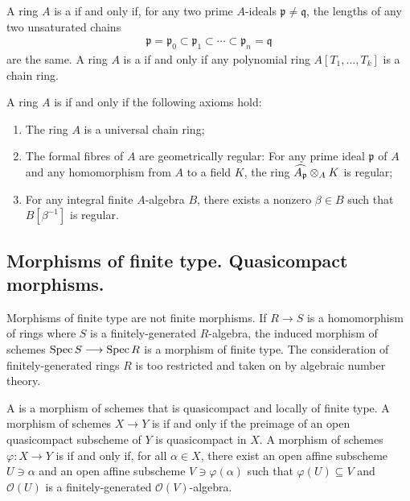 \documentclass [11 pt, oneside] {article}
\begin{document}
\begin{definition}[ ]\label{}\text{}
A ring $A$ is a  if and only if, for any two prime $A$-ideals $\mathfrak{p}\ne \mathfrak{q}$, the lengths of any two unsaturated chains 
\begin{align*}
	\mathfrak{p} = \mathfrak{p}_0 \subset \mathfrak{p}_1\subset\cdots\subset \mathfrak{p}_n=\mathfrak{q}
\end{align*}
are the same. A ring $A$ is a  if and only if any polynomial ring $A[T_1,\hdots, T_k]$ is a chain ring.
\end{definition}


\begin{definition}[ ]\label{}\text{}
A ring $A$ is  if and only if the following axioms hold:
\begin{enumerate}
	\item The ring $A$ is a universal chain ring;
	\item The formal fibres of $A$ are geometrically regular: For any prime ideal $\mathfrak{p}$ of $A$ and any homomorphism from $A$ to a field $K$, the ring $\widehat{A_{\mathfrak{p}}}\otimes_A K$ is regular;
	\item For any integral finite $A$-algebra $B$, there exists a nonzero $\beta\in B$ such that $B[\beta^{-1}]$ is regular.
\end{enumerate}
\end{definition}

\subsection{Morphisms of finite type. Quasicompact morphisms.}
Morphisms of finite type are not finite morphisms. If $R\longrightarrow S$ is a homomorphism of rings where $S$ is a finitely-generated $R$-algebra, the induced morphism of schemes $\operatorname{Spec} S \longrightarrow \operatorname{Spec} R$ is a morphism of finite type. The consideration of finitely-generated rings $R$ is too restricted and taken on by algebraic number theory.

A  is a morphism of schemes that is quasicompact and locally of finite type. A morphism of schemes $X\longrightarrow Y$ is  if and only if the preimage of an open quasicompact subscheme of $Y$ is quasicompact in $X$. A morphism of schemes $\varphi: X\longrightarrow Y$ is  if and only if, for all $\alpha\in X$, there exist an open affine subscheme $U\ni \alpha$ and an open affine subscheme $V \ni \varphi(\alpha)$ such that $\varphi(U)\subseteq V$ and $\mathscr{O}(U)$ is a finitely-generated $\mathscr{O}(V)$-algebra.
\end{document}
